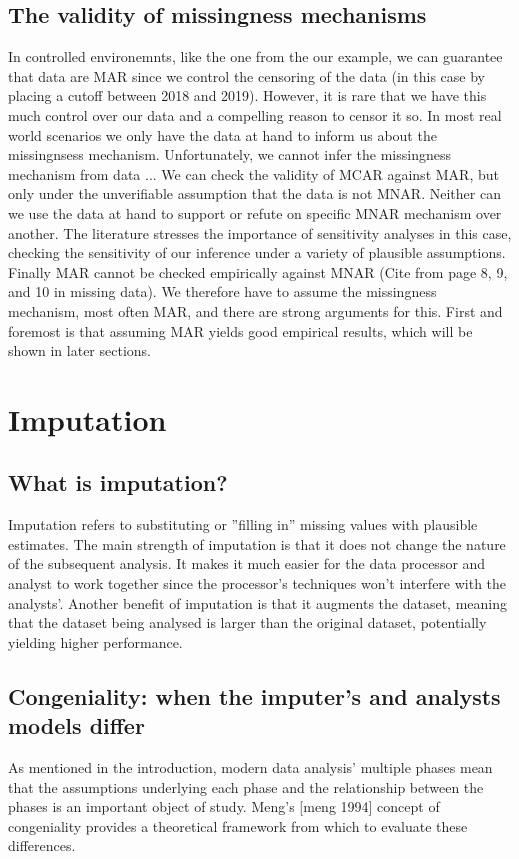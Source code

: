 \documentclass{article}
\begin{document}
	
	\subsection{The validity of missingness mechanisms}
	
	In controlled environemnts, like the one from the our example, we can guarantee that data are MAR since we control the censoring of the data (in this case by placing a cutoff between 2018 and 2019). However, it is rare that we have this much control over our data and a compelling reason to censor it so. In most real world scenarios we only have the data at hand to inform us about the missingnsess mechanism. Unfortunately, we cannot infer the missingness mechanism from data ...  We can check the validity of MCAR against MAR, but only under the unverifiable assumption that the data is not MNAR. Neither can we use the data at hand to support or refute on specific MNAR mechanism over another. The literature stresses the importance of sensitivity analyses in this case, checking the sensitivity of our inference under a variety of plausible assumptions. Finally MAR cannot be checked empirically against MNAR  (Cite from page 8, 9, and 10 in missing data). We therefore have to assume the missingness mechanism, most often MAR, and there are strong arguments for this. First and foremost is that assuming MAR yields good empirical results, which will be shown in later sections. %
	
	\section{Imputation}
	
	\subsection{What is imputation?}
	Imputation refers to substituting or ''filling in'' missing values with plausible estimates. The main strength of imputation is that it does not change the nature of the subsequent analysis. It makes it much easier for the data processor and analyst to work together since the processor's techniques won't interfere with the analysts'.
	 Another benefit of imputation is that it augments the dataset, meaning that the dataset being analysed is larger than the original dataset, potentially yielding higher performance.
	
	\subsection{Congeniality: when the imputer's and analysts models differ}
	As mentioned in the introduction, modern data analysis' multiple phases mean that the assumptions underlying each phase and the relationship between the phases is an important object of study.  Meng's [meng 1994] concept of congeniality provides a theoretical framework from which to evaluate these differences.
	
\end{document}

